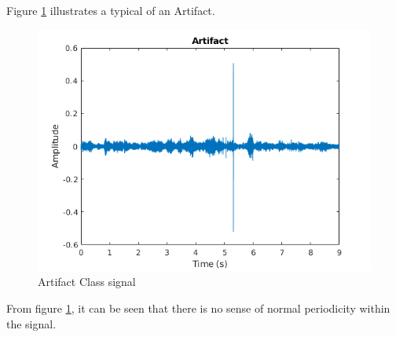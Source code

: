 \documentclass[10pt,twocolumn]{witseiepaper}
\begin{document}
Figure \ref{fig:arti} illustrates a typical of an Artifact.
\begin{figure}[h!]
    \centering
    \includegraphics[scale = 0.45]{./arti.png}
    \caption{Artifact Class signal}
    \label{fig:arti}
\end{figure}{}

From figure \ref{fig:arti}, it can be seen that there is no sense of normal periodicity within the signal.
\end{document}
